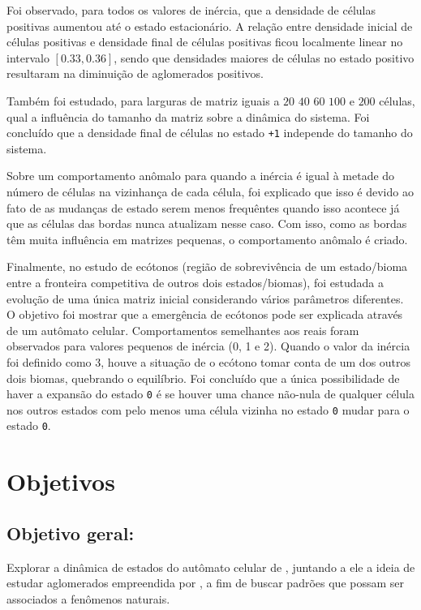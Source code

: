 \documentclass[
	12pt,				%
	openright,			%
	twoside,			%
	a4paper,			%
	english,			%
	french,				%
	spanish,			%
	brazil				%
	]{abntex2}
\begin{document}
Foi observado, para todos os valores de inércia, que a densidade de células positivas aumentou até o estado estacionário. A relação entre densidade inicial de células positivas e densidade final de células positivas ficou localmente linear no intervalo $[0.33, 0.36]$, sendo que densidades maiores de células no estado positivo resultaram na diminuição de aglomerados positivos.

Também foi estudado, para larguras de matriz iguais a $20$ $40$ $60$ $100$ e $200$ células, qual a influência do tamanho da matriz sobre a dinâmica do sistema. Foi concluído que a densidade final de células no estado \texttt{+1} independe do tamanho do sistema.

Sobre um comportamento anômalo para quando a inércia é igual à metade do número de células na vizinhança de cada célula, foi explicado que isso é devido ao fato de as mudanças de estado serem menos frequêntes quando isso acontece já que as células das bordas nunca atualizam nesse caso. Com isso, como as bordas têm muita influência em matrizes pequenas, o comportamento anômalo é criado.

Finalmente, no estudo de ecótonos (região de sobrevivência de um estado/bioma entre a fronteira competitiva de outros dois estados/biomas), foi estudada a evolução de uma única matriz inicial considerando vários parâmetros diferentes. O objetivo foi mostrar que a emergência de ecótonos pode ser explicada através de um autômato celular. Comportamentos semelhantes aos reais foram observados para valores pequenos de inércia (0, 1 e 2). Quando o valor da inércia foi definido como $3$, houve a situação de o ecótono tomar conta de um dos outros dois biomas, quebrando o equilíbrio. Foi concluído que a única possibilidade de haver a expansão do estado \texttt{0} é se houver uma chance não-nula de qualquer célula nos outros estados com pelo menos uma célula vizinha no estado \texttt{0} mudar para o estado \texttt{0}.

\section*{Objetivos}


\subsection*{Objetivo geral:}
Explorar a dinâmica de estados do autômato celular de , juntando a ele a ideia de estudar aglomerados empreendida por , a fim de buscar padrões que possam ser associados a fenômenos naturais.
\end{document}
